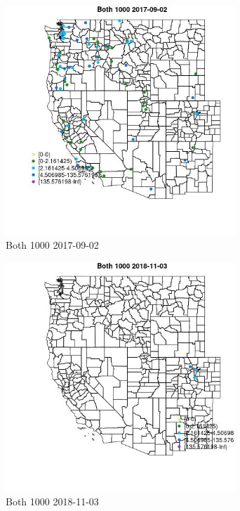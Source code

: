 \begin{figure} 
\centering  
\includegraphics[width=0.77\textwidth]{Code_Outputs/Report_ML_input_PM25_Step4_part_e_de_duplicated_aveswNAs_MapObsBoth_10002017-09-02.jpg} 
\caption{\label{fig:Report_ML_input_PM25_Step4_part_e_de_duplicated_aveswNAsMapObsBoth_10002017-09-02}Both 1000 2017-09-02} 
\end{figure} 
 

\begin{figure} 
\centering  
\includegraphics[width=0.77\textwidth]{Code_Outputs/Report_ML_input_PM25_Step4_part_e_de_duplicated_aveswNAs_MapObsBoth_10002018-11-03.jpg} 
\caption{\label{fig:Report_ML_input_PM25_Step4_part_e_de_duplicated_aveswNAsMapObsBoth_10002018-11-03}Both 1000 2018-11-03} 
\end{figure} 
 

